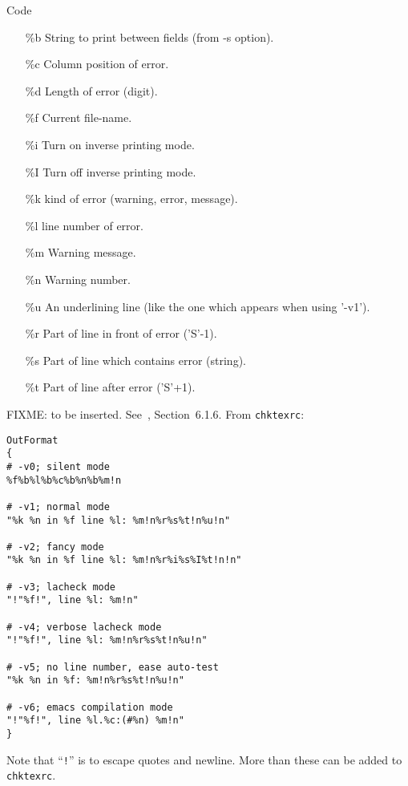 Code
%
\begin{itemize}
\item[\%b]
String to print between fields (from -s option).
\item[\%c]
Column position of error.
\item[\%d]
Length of error (digit).
\item[\%f]
Current file-name.
\item[\%i]
Turn on inverse printing mode.
\item[\%I]
Turn off inverse printing mode.
\item[\%k]
kind of error (warning, error, message).
\item[\%l]
line number of error.
\item[\%m]
Warning message.
\item[\%n]
Warning number.
\item[\%u]
An underlining line (like the one which appears when using '-v1').
\item[\%r]
Part of line in front of error ('S'-1).
\item[\%s]
Part of line which contains error (string).
\item[\%t]
Part of line after error ('S'+1).
\end{itemize}



FIXME\@: to be inserted. 
See~\cite{ChkTeX22}, Section~6.1.6. 
From \texttt{chktexrc}: 
\begin{verbatim}
OutFormat
{
# -v0; silent mode
%f%b%l%b%c%b%n%b%m!n

# -v1; normal mode
"%k %n in %f line %l: %m!n%r%s%t!n%u!n"

# -v2; fancy mode
"%k %n in %f line %l: %m!n%r%i%s%I%t!n!n"

# -v3; lacheck mode
"!"%f!", line %l: %m!n"

# -v4; verbose lacheck mode
"!"%f!", line %l: %m!n%r%s%t!n%u!n"

# -v5; no line number, ease auto-test
"%k %n in %f: %m!n%r%s%t!n%u!n"

# -v6; emacs compilation mode
"!"%f!", line %l.%c:(#%n) %m!n"
}
\end{verbatim}

Note that ``\texttt{!}'' is to escape quotes and newline. 
More than these can be added to \texttt{chktexrc}. 


